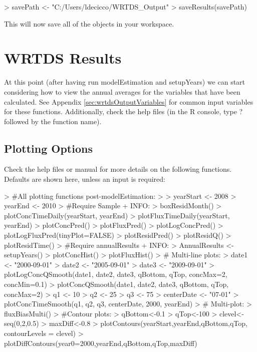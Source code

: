 \documentclass[a4paper,11pt]{article}
\begin{document}
\begin{Schunk}
\begin{Sinput}
> savePath <- "C:/Users/ldecicco/WRTDS_Output"
> saveResults(savePath) 
\end{Sinput}
\end{Schunk}

This will now save all of the objects in your workspace.  

\section{WRTDS Results}
\label{sec:wrtdsResults}
At this point (after having run modelEstimation and setupYears) we can start considering how to view the annual averages for the variables that have been calculated.  See Appendix \ref{sec:wrtdsOutputVariables} for common input variables for these functions. Additionally, check the help files (in the R console, type ? followed by the function name).

\subsection{Plotting Options}
\label{sec:wrtdsPlotting}
Check the help files or manual for more details on the following functions.  Defaults are shown here, unless an input is required:

\begin{Schunk}
\begin{Sinput}
> #All plotting functions post-modelEstimation:
> 
> yearStart <- 2008
> yearEnd <- 2010
> #Require Sample + INFO:
> boxResidMonth()
> plotConcTimeDaily(yearStart, yearEnd)
> plotFluxTimeDaily(yearStart, yearEnd)
> plotConcPred()
> plotFluxPred()
> plotLogConcPred()
> plotLogFluxPred(tinyPlot=FALSE)
> plotResidPred()
> plotResidQ()
> plotResidTime()
> #Require annualResults + INFO:
> AnnualResults <- setupYears()
> plotConcHist()
> plotFluxHist()
> # Multi-line plots:
> date1 <- "2000-09-01"
> date2 <- "2005-09-01"
> date3 <- "2009-09-01"
> plotLogConcQSmooth(date1, date2, date3, qBottom, qTop, concMax=2, concMin=0.1)
> plotConcQSmooth(date1, date2, date3, qBottom, qTop, concMax=2)
> q1 <- 10
> q2 <- 25
> q3 <- 75
> centerDate <- "07-01"
> plotConcTimeSmooth(q1, q2, q3, centerDate, 2000, yearEnd)
> # Multi-plot:
> fluxBiasMulti()
> #Contour plots:
> qBottom<-0.1
> qTop<-100
> clevel<-seq(0,2,0.5)
> maxDiff<-0.8
> plotContours(yearStart,yearEnd,qBottom,qTop, contourLevels = clevel)
> plotDiffContours(year0=2000,yearEnd,qBottom,qTop,maxDiff)
\end{Sinput}
\end{Schunk}
\end{document}
